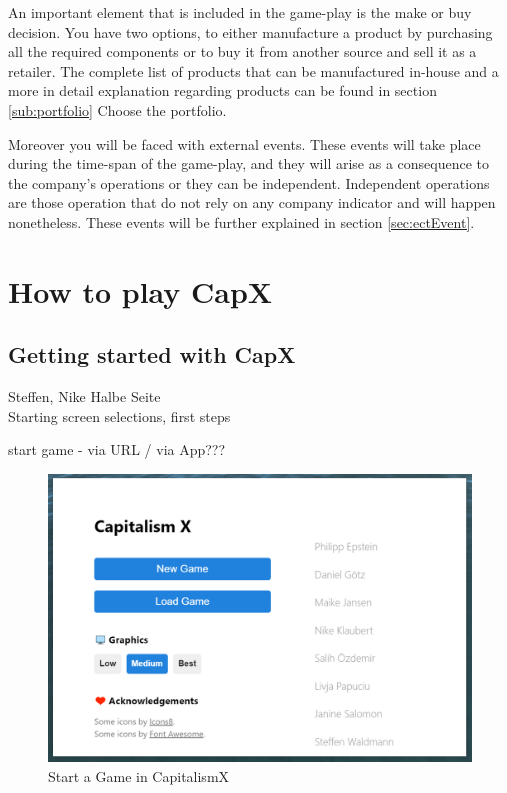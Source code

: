 \documentclass[11pt,titlepage,oneside,openany]{book}
\begin{document}
An important element that is included in the game-play is the make or buy decision. You have two options, to either manufacture a product by purchasing all the required components or to buy it from another source and sell it as a retailer. The complete list of products that can be manufactured in-house and a more in detail explanation regarding products can be found in section \ref{sub:portfolio} Choose the portfolio. 

Moreover you will be faced with external events. These events will take place during the time-span of the game-play, and they will arise as a consequence to the company’s operations or they can be independent. Independent operations are those operation that do not rely on any company indicator and will happen nonetheless. These events will be further explained in section \ref{sec:ectEvent}.	

\chapter{How to play CapX}

\section{Getting started with CapX}
Steffen, Nike Halbe Seite\\

Starting screen selections, first steps

start game - via URL / via App???

\begin{figure} [!htbp]
    \centering
    \includegraphics [width=\textwidth] {images/startingScreen.png}
    \caption{Start a Game in CapitalismX}
    \label{fig:startingScreen}
\end{figure}
\end{document}
